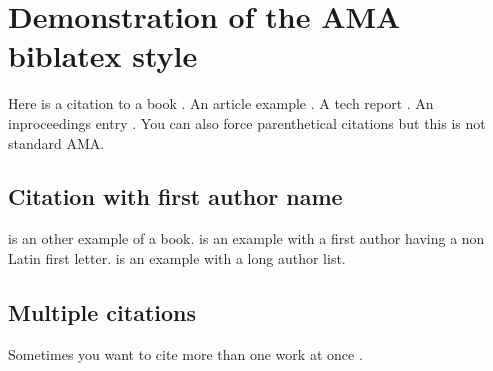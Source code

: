 \documentclass[a4paper,12pt]{article}
\begin{document}
\section*{Demonstration of the AMA biblatex style}

Here is a citation to a book \cite{whole-collection}.  
An article example \cite{article-minimal}.  
A tech report \cite{techreport-minimal}.  
An inproceedings entry \cite{inproceedings-full}.
You can also force parenthetical citations \parencite{techreport-minimal} but this is not standard AMA.

\subsection*{Citation with first author name}
\textcite{Lamport:Book:1989} is an other example of a book.
\textcite{Smigoc:FRONTNEURO:2023} is an example with a first author having a non Latin first letter.
\textcite{Byoun:CNN:2016} is an example with a long author list. 

\subsection*{Multiple citations}
Sometimes you want to cite more than one work at once \cite{Byoun:CNN:2016,article-minimal,techreport-minimal,whole-collection}.

\printbibliography
\end{document}
